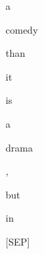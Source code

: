 \documentclass[varwidth=150mm]{standalone}
\begin{document}
\begin{CJK*}{UTF8}{gbsn}
{{{\colorbox{red!1.7525608539581299}{\strut a} \colorbox{red!8.30408000946045}{\strut comedy} \colorbox{red!1.0401432514190674}{\strut than} \colorbox{red!3.956540822982788}{\strut it} \colorbox{red!0.0}{\strut is} \colorbox{red!0.0}{\strut a} \colorbox{red!17.23443031311035}{\strut drama} \colorbox{red!0.0}{\strut ,} \colorbox{red!8.575431823730469}{\strut but} \colorbox{red!25.74485969543457}{\strut in} \colorbox{red!0.0}{\strut [SEP]}
}}}
\end{CJK*}
\end{document}
